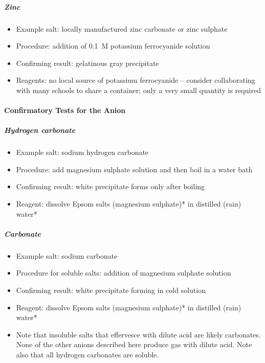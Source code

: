 \subparagraph{Zinc}
\begin{itemize}
\item{Example salt: locally manufactured zinc carbonate 
or zinc sulphate}
\item{Procedure: addition of 0.1~M potassium ferrocyanide solution}
\item{Confirming result: gelatinous gray precipitate}
\item{Reagents: no local source of potassium ferrocyanide -- consider collaborating with many schools to share a container; only a very small quantity is required}
\end{itemize}

\paragraph{Confirmatory Tests for the Anion} 

\subparagraph{Hydrogen carbonate}
\begin{itemize}
\item{Example salt: sodium hydrogen carbonate}
\item{Procedure: add magnesium sulphate solution and then boil in a water bath}
\item{Confirming result: white precipitate forms only after boiling}
\item{Reagent: dissolve Epsom salts (magnesium sulphate)* in distilled (rain) water*}
\end{itemize}

\subparagraph{Carbonate}
\begin{itemize}
\item{Example salt: sodium carbonate}
\item{Procedure for soluble salts: addition of magnesium sulphate solution}
\item{Confirming result: white precipitate forming in cold solution}
\item{Reagent: dissolve Epsom salts (magnesium sulphate)* in distilled (rain) water*}

\item{Note that insoluble salts that effervesce with dilute acid are likely carbonates. 
None of the other anions described here produce gas with dilute acid. Note also that all hydrogen carbonates are soluble.}

\end{itemize}

